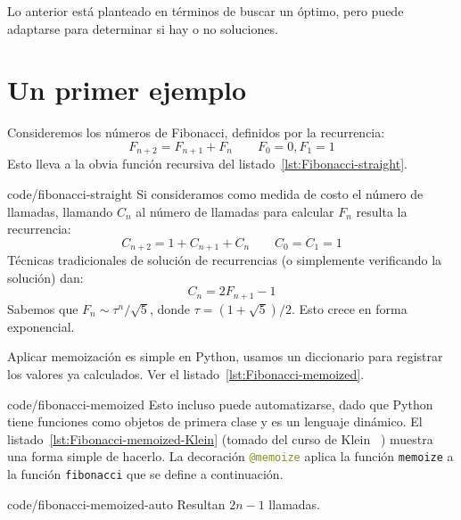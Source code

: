   Lo anterior está planteado en términos de buscar un óptimo,
  pero puede adaptarse para determinar si hay o no soluciones.

\section{Un primer ejemplo}
\label{sec:primer-ejemplo-programacion-dinamica}

  Consideremos los números de Fibonacci,
  definidos por la recurrencia:
  \begin{equation}
    \label{eq:Fibonacci-recurrence}
    F_{n + 2}
      = F_{n + 1} + F_n
      \qquad F_0 = 0, F_1 = 1
  \end{equation}
  Esto lleva a la obvia función recursiva
  del listado~\ref{lst:Fibonacci-straight}.
  
		  {code/fibonacci-straight}
  Si consideramos como medida de costo el número de llamadas,
  llamando \(C_n\) al número de llamadas para calcular \(F_n\)
  resulta la recurrencia:
  \begin{equation}
    \label{eq:Fibonacci-straight-cost-recurrence}
    C_{n + 2}
      = 1 + C_{n + 1} + C_n
      \qquad C_0 = C_1 = 1
  \end{equation}
  Técnicas tradicionales de solución de recurrencias
  (o simplemente verificando la solución)
  dan:
  \begin{equation}
    \label{eq:Fibonacci-straight-cost}
    C_n
      = 2 F_{n + 1} - 1
  \end{equation}
  Sabemos que \(F_n \sim \tau^n / \sqrt{5}\),
  donde \(\tau = (1 + \sqrt{5}) / 2\).
  Esto crece en forma exponencial.

  Aplicar memoización es simple en Python,
  usamos un diccionario para registrar los valores ya calculados.
  Ver el listado~\ref{lst:Fibonacci-memoized}.
  
		   {code/fibonacci-memoized}
  Esto incluso puede automatizarse,
  dado que Python tiene funciones como objetos de primera clase
  y es un lenguaje dinámico.
  El listado~\ref{lst:Fibonacci-memoized-Klein}
  (tomado del curso de Klein~%
     \cite{klein20:_python_course})
  muestra una forma simple de hacerlo.
  La decoración \lstinline[language = Python]!@memoize!
  aplica la función \lstinline[language = Python]!memoize!
  a la función \lstinline[language = Python]!fibonacci!
  que se define a continuación.
  
		   {code/fibonacci-memoized-auto}
  Resultan \(2 n - 1\) llamadas.

